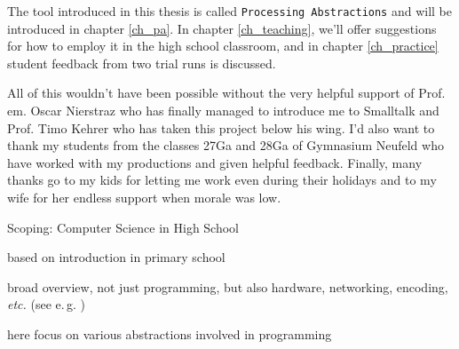 The tool introduced in this thesis is called \texttt{Processing Abstractions} and will be introduced in chapter \ref{ch_pa}. In chapter \ref{ch_teaching}, we'll offer suggestions for how to employ it in the high school classroom, and in chapter \ref{ch_practice} student feedback from two trial runs is discussed.

All of this wouldn't have been possible without the very helpful support of Prof.\,em. Oscar Nierstraz who has finally managed to introduce me to Smalltalk and Prof. Timo Kehrer who has taken this project below his wing. I'd also want to thank my students from the classes 27Ga and 28Ga of Gymnasium Neufeld who have worked with my productions and given helpful feedback. Finally, many thanks go to my kids for letting me work even during their holidays and to my wife for her endless support when morale was low.


\begin{todo}
\item Scoping: Computer Science in High School
\item based on introduction in primary school
\item broad overview, not just programming, but also hardware, networking, encoding, \emph{etc.} (see e.\,g. \cite{Erz16})
\item here focus on various abstractions involved in programming
\end{todo}
